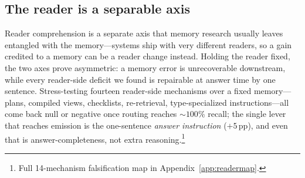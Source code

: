 \documentclass{article} %
\newcommand{\pp}{\,\mathrm{pp}}
\begin{document}
\subsection{The reader is a separable axis}
\label{sec:reader}
Reader comprehension is a separate axis that memory research usually leaves
entangled with the memory---systems ship with very different readers, so a gain
credited to a memory can be a reader change instead. Holding the reader fixed, the
two axes prove asymmetric: a memory error is unrecoverable downstream, while every
reader-side deficit we found is repairable at answer time by one sentence. Stress-testing
fourteen reader-side mechanisms over a fixed memory---plans, compiled views,
checklists, re-retrieval, type-specialized instructions---all come back null or
negative once routing reaches $\sim\!100\%$ recall; the single lever that reaches
emission is the one-sentence \emph{answer instruction} ($+5\pp$), and even that is
answer-completeness, not extra reasoning.\footnote{Full 14-mechanism falsification map
in Appendix~\ref{app:readermap}.}
\end{document}

